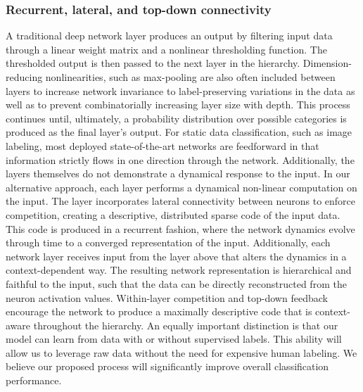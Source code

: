 \subsubsection{Recurrent, lateral, and top-down connectivity}
A traditional deep network layer produces an output by filtering input data through a linear weight matrix and a nonlinear thresholding function. The thresholded output is then passed to the next layer in the hierarchy. Dimension-reducing nonlinearities, such as max-pooling are also often included between layers to increase network invariance to label-preserving variations in the data as well as to prevent combinatorially increasing layer size with depth. This process continues until, ultimately, a probability distribution over possible categories is produced as the final layer’s output. For static data classification, such as image labeling, most deployed state-of-the-art networks are feedforward in that information strictly flows in one direction through the network. Additionally, the layers themselves do not demonstrate a dynamical response to the input. In our alternative approach, each layer performs a dynamical non-linear computation on the input. The layer incorporates lateral connectivity between neurons to enforce competition, creating a descriptive, distributed sparse code of the input data. This code is produced in a recurrent fashion, where the network dynamics evolve through time to a converged representation of the input. Additionally, each network layer receives input from the layer above that alters the dynamics in a context-dependent way. The resulting network representation is hierarchical and faithful to the input, such that the data can be directly reconstructed from the neuron activation values. Within-layer competition and top-down feedback encourage the network to produce a maximally descriptive code that is context-aware throughout the hierarchy. An equally important distinction is that our model can learn from data with or without supervised labels. This ability will allow us to leverage raw data without the need for expensive human labeling. We believe our proposed process will significantly improve overall classification performance.


